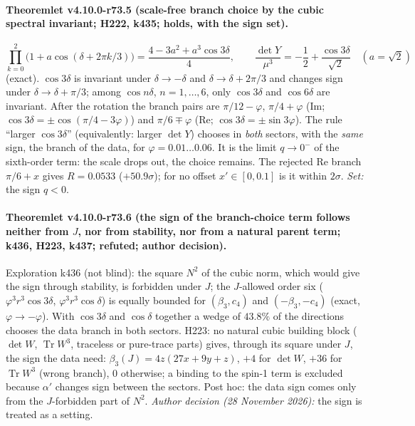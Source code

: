 \paragraph{Theoremlet v4.10.0-r73.5 (scale-free branch choice by the cubic spectral invariant; H222, k435; holds, with the sign set).}
\[
\prod_{k=0}^{2}\bigl(1+a\cos(\delta+2\pi k/3)\bigr)=\frac{4-3a^2+a^3\cos3\delta}{4},
\qquad
\frac{\det Y}{\mu^3}=-\frac12+\frac{\cos3\delta}{\sqrt2}\quad(a=\sqrt2)
\]
(exact).  \(\cos3\delta\) is invariant under \(\delta\to-\delta\) and \(\delta\to\delta+2\pi/3\) and changes sign under \(\delta\to\delta+\pi/3\); among
\(\cos n\delta\), \(n=1,\dots,6\), only \(\cos3\delta\) and \(\cos6\delta\) are invariant.  After the rotation the branch pairs are \(\pi/12-\varphi\),
\(\pi/4+\varphi\) (Im; \(\cos3\delta=\pm\cos(\pi/4-3\varphi)\)) and \(\pi/6\mp\varphi\) (Re; \(\cos3\delta=\pm\sin3\varphi\)).  The rule ``larger
\(\cos3\delta\)'' (equivalently: larger \(\det Y\)) chooses in \emph{both} sectors, with the \emph{same} sign, the branch of the data, for
\(\varphi=0.01\ldots0.06\).  It is the limit \(q\to0^-\) of the sixth-order term: the scale drops out, the choice remains.  The rejected Re branch
\(\pi/6+x\) gives \(R=0.0533\) (\(+50.9\sigma\)); for no offset \(x'\in[0,0.1]\) is it within \(2\sigma\).  \emph{Set:} the sign \(q<0\).

\paragraph{Theoremlet v4.10.0-r73.6 (the sign of the branch-choice term follows neither from \(J\), nor from stability, nor from a natural parent term; k436, H223, k437; refuted; author decision).}
Exploration k436 (not blind): the square \(N^2\) of the cubic norm, which would give the sign through stability, is forbidden under \(J\);
the \(J\)-allowed order six (\(\varphi^3r^3\cos3\delta\), \(\varphi^3r^3\cos\delta\)) is equally bounded for \((\beta_3,c_4)\) and \((-\beta_3,-c_4)\)
(exact, \(\varphi\to-\varphi\)).  With \(\cos3\delta\) and \(\cos\delta\) together a wedge of \(43.8\%\) of the directions chooses the data branch in
both sectors.  H223: no natural cubic building block (\(\det W\), \(\operatorname{Tr}W^3\), traceless or pure-trace parts) gives, through its
square under \(J\), the sign the data need: \(\beta_3(J)=4z(27x+9y+z)\), \(+4\) for \(\det W\), \(+36\) for \(\operatorname{Tr}W^3\) (wrong branch), 0
otherwise; a binding to the spin-1 term is excluded because \(\alpha'\) changes sign between the sectors.  Post hoc: the data sign comes only
from the \(J\)-forbidden part of \(N^2\).  \emph{Author decision (28 November 2026):} the sign is treated as a setting.

